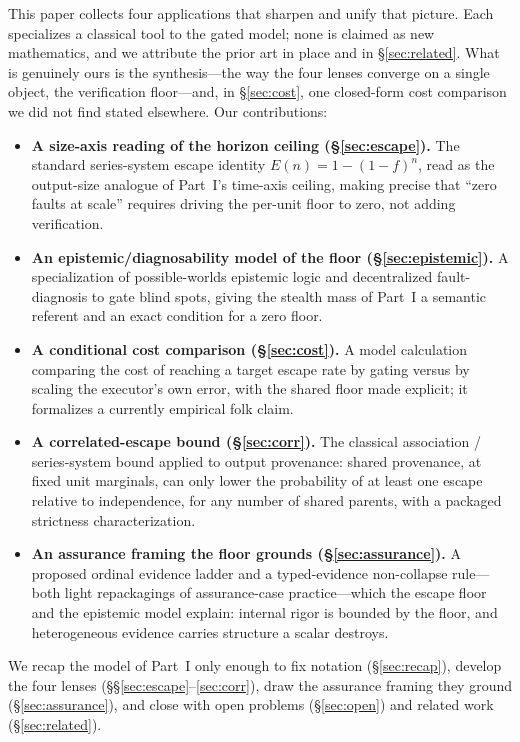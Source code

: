 \documentclass[11pt]{article}
\theoremstyle{definition}
\theoremstyle{remark}
\newcommand{\Esc}{E}
\newcommand{\fesc}{f}
\begin{document}
This paper collects four applications that sharpen and unify that picture. Each specializes a
classical tool to the gated model; none is claimed as new mathematics, and we attribute the prior art
in place and in \S\ref{sec:related}. What is genuinely ours is the synthesis---the way the four
lenses converge on a single object, the verification floor---and, in \S\ref{sec:cost}, one closed-form
cost comparison we did not find stated elsewhere. Our contributions:
\begin{itemize}[leftmargin=1.4em,itemsep=2pt]
\item \textbf{A size-axis reading of the horizon ceiling (\S\ref{sec:escape}).} The standard
series-system escape identity $\Esc(n)=1-(1-\fesc)^n$, read as the output-size analogue of Part~I's
time-axis ceiling, making precise that ``zero faults at scale'' requires driving the per-unit floor to
zero, not adding verification.
\item \textbf{An epistemic/diagnosability model of the floor (\S\ref{sec:epistemic}).} A specialization
of possible-worlds epistemic logic and decentralized fault-diagnosis to gate blind spots, giving the
stealth mass of Part~I a semantic referent and an exact condition for a zero floor.
\item \textbf{A conditional cost comparison (\S\ref{sec:cost}).} A model calculation comparing the cost
of reaching a target escape rate by gating versus by scaling the executor's own error, with the shared
floor made explicit; it formalizes a currently empirical folk claim.
\item \textbf{A correlated-escape bound (\S\ref{sec:corr}).} The classical association / series-system
bound applied to output provenance: shared provenance, at fixed unit marginals, can only lower the
probability of at least one escape relative to independence, for any number of shared parents, with a
packaged strictness characterization.
\item \textbf{An assurance framing the floor grounds (\S\ref{sec:assurance}).} A proposed ordinal
evidence ladder and a typed-evidence non-collapse rule---both light repackagings of assurance-case
practice---which the escape floor and the epistemic model explain: internal rigor is bounded by the
floor, and heterogeneous evidence carries structure a scalar destroys.
\end{itemize}
We recap the model of Part~I only enough to fix notation (\S\ref{sec:recap}), develop the four lenses
(\S\S\ref{sec:escape}--\ref{sec:corr}), draw the assurance framing they ground (\S\ref{sec:assurance}),
and close with open problems (\S\ref{sec:open}) and related work (\S\ref{sec:related}).
\end{document}
